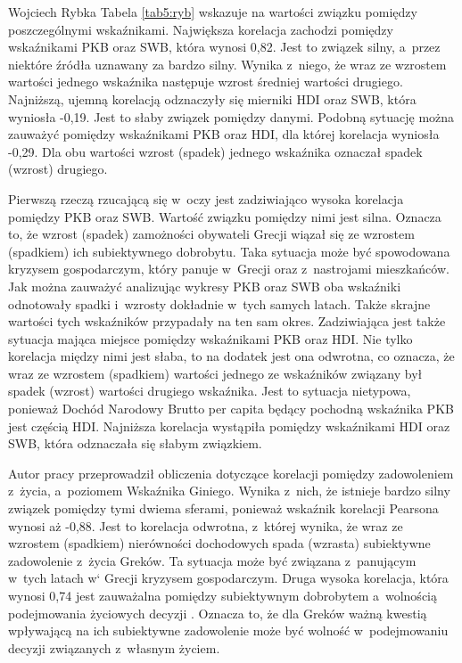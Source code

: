 \begin{artplenv}{Wojciech Rybka}
Tabela \ref{tab5:ryb} wskazuje na wartości związku pomiędzy poszczególnymi wskaźnikami. Największa korelacja zachodzi pomiędzy
wskaźnikami PKB oraz SWB, która wynosi 0,82. Jest to związek silny, a~przez niektóre źródła uznawany za bardzo silny.
Wynika z~niego, że wraz ze wzrostem wartości jednego wskaźnika następuje wzrost średniej wartości drugiego. Najniższą,
ujemną korelacją odznaczyły się mierniki HDI oraz SWB, która wyniosła -0,19. Jest to słaby związek pomiędzy danymi.
Podobną sytuację można zauważyć pomiędzy wskaźnikami PKB oraz HDI, dla której korelacja wyniosła -0,29. Dla obu
wartości wzrost (spadek) jednego wskaźnika oznaczał spadek (wzrost) drugiego. 

Pierwszą rzeczą rzucającą się w~oczy jest zadziwiająco wysoka korelacja pomiędzy PKB oraz SWB. Wartość
związku pomiędzy nimi jest silna. Oznacza to, że wzrost (spadek) zamożności obywateli
Grecji wiązał się ze wzrostem (spadkiem) ich subiektywnego dobrobytu. Taka sytuacja może być spowodowana kryzysem
gospodarczym, który panuje w~Grecji oraz z~nastrojami mieszkańców. Jak można zauważyć analizując wykresy PKB oraz SWB
oba wskaźniki odnotowały spadki i~wzrosty dokładnie w~tych samych latach. Także skrajne wartości tych wskaźników
przypadały na ten sam okres. Zadziwiająca jest także sytuacja mająca miejsce pomiędzy wskaźnikami PKB oraz HDI. Nie
tylko korelacja między nimi jest słaba, to na dodatek jest ona odwrotna, co oznacza, że wraz ze wzrostem (spadkiem)
wartości jednego ze wskaźników związany był spadek (wzrost) wartości drugiego wskaźnika. Jest to sytuacja nietypowa,
ponieważ Dochód Narodowy Brutto per capita będący pochodną wskaźnika PKB jest częścią HDI. Najniższa korelacja
wystąpiła pomiędzy wskaźnikami HDI oraz SWB, która odznaczała się słabym związkiem. 

Autor pracy przeprowadził obliczenia dotyczące korelacji pomiędzy zadowoleniem z~życia, a~poziomem Wskaźnika Giniego.
Wynika z~nich, że istnieje bardzo silny związek pomiędzy tymi dwiema sferami, ponieważ wskaźnik korelacji Pearsona
wynosi aż -0,88. Jest to korelacja odwrotna, z~której wynika, że wraz ze wzrostem (spadkiem) nierówności dochodowych
spada (wzrasta) subiektywne zadowolenie z~życia Greków. Ta sytuacja może być związana z~panującym w~tych
latach w` Grecji kryzysem gospodarczym. Druga wysoka korelacja, która wynosi 0,74 jest zauważalna pomiędzy subiektywnym
dobrobytem a~wolnością podejmowania życiowych decyzji
\parencite{noauthor_world_2018}.
Oznacza
to, że dla Greków ważną kwestią wpływającą na ich subiektywne zadowolenie może być wolność w~podejmowaniu decyzji
związanych z~własnym życiem.


\end{artplenv}
